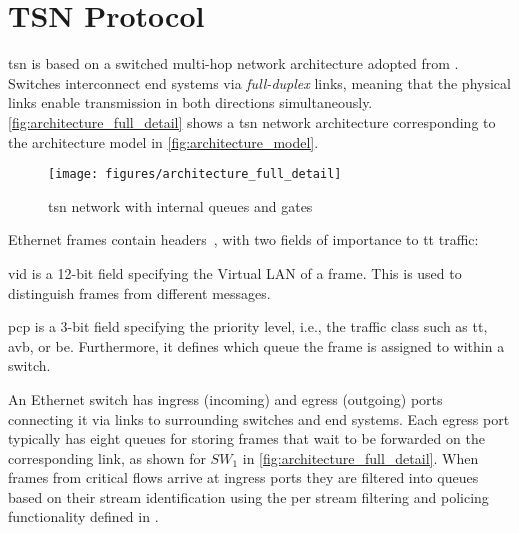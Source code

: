 \section{TSN Protocol} \label{sec:tsn}
\gls{tsn} is based on a switched multi-hop network architecture adopted from .
Switches interconnect end systems via \emph{full-duplex} links, meaning that the physical links enable transmission in both directions simultaneously.
\autoref{fig:architecture_full_detail} shows a \gls{tsn} network architecture corresponding to the architecture model in \autoref{fig:architecture_model}.

\begin{figure}[b]
    \centering
    \texttt{[image: figures/architecture\_full\_detail]}
    \caption{\gls{tsn} network with internal queues and gates}
    \label{fig:architecture_full_detail}
\end{figure}

Ethernet frames contain  headers~\cite{8021q}, with two fields of importance to \gls{tt} traffic:
\begin{enumerate*}[(1)]
   \item \gls{vid} is a 12-bit field specifying the Virtual LAN of a frame. This is used to distinguish frames from different messages.
   \item \gls{pcp} is a 3-bit field specifying the priority level, i.e., the traffic class such as \gls{tt}, \gls{avb}, or \gls{be}.
   Furthermore, it defines which queue the frame is assigned to within a switch.
\end{enumerate*}

An Ethernet switch has ingress (incoming) and egress (outgoing) ports connecting it via links to surrounding switches and end systems.
Each egress port typically has eight queues for storing frames that wait to be forwarded on the corresponding link, as shown for $SW_1$ in \autoref{fig:architecture_full_detail}.
When frames from critical flows arrive at ingress ports they are filtered into queues based on their stream identification using the per stream filtering and policing functionality defined in .

